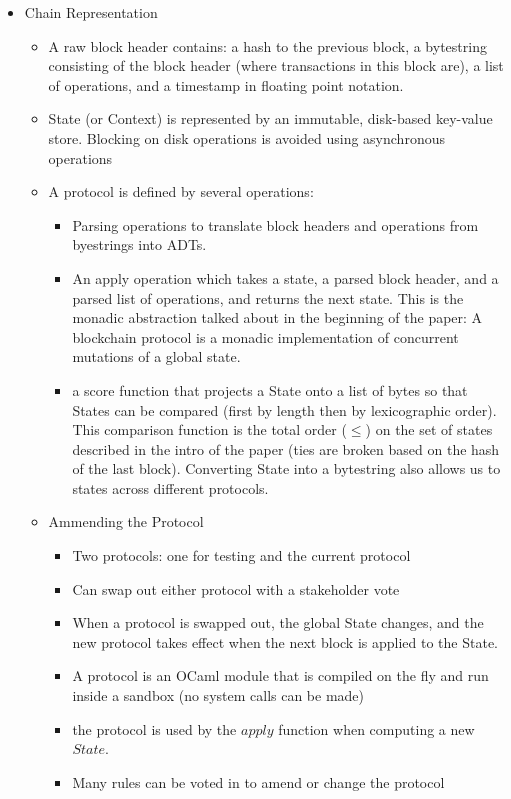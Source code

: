 \documentclass[a4paper]{article}
\begin{document}
\begin{itemize}
\item Chain Representation
\begin{itemize}
\item A raw block header contains: a hash to the previous block, a bytestring consisting of the block header (where transactions in this block are), a list of operations, and a timestamp in floating point notation.
\item State (or Context) is represented by an immutable, disk-based key-value store. Blocking on disk operations is avoided using asynchronous operations
\item A protocol is defined by several operations:
\begin{itemize}
\item Parsing operations to translate block headers and operations from byestrings into ADTs.
\item An apply operation which takes a state, a parsed block header, and a parsed list of operations, and returns the next state. This is the monadic abstraction talked about in the beginning of the paper: A blockchain protocol is a monadic implementation of concurrent mutations of a global state.
\item a score function that projects a State onto a list of bytes so that States can be compared (first by length then by lexicographic order). This comparison function is the total order ($\leq$) on the set of states described in the intro of the paper (ties are broken based on the hash of the last block). Converting State into a bytestring also allows us to states across different protocols.
\end{itemize}

\item Ammending the Protocol
\begin{itemize}
\item Two protocols: one for testing and the current protocol
\item Can swap out either protocol with a stakeholder vote
\item When a protocol is swapped out, the global State changes, and the new protocol takes effect when the next block is applied to the State.
\item A protocol is an OCaml module that is compiled on the fly and run inside a sandbox (no system calls can be made)
\item the protocol is used by the $apply$ function when computing a new $State$.
\item Many rules can be voted in to amend or change the protocol
\end{itemize}


\end{itemize}
\end{itemize}
\end{document}
